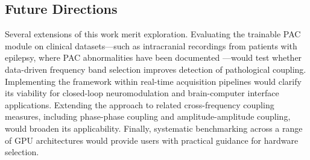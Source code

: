 \subsection{Future Directions}
Several extensions of this work merit exploration. Evaluating the trainable PAC module on clinical datasets---such as intracranial recordings from patients with epilepsy, where PAC abnormalities have been documented \cite{tort_measuring_2010}---would test whether data-driven frequency band selection improves detection of pathological coupling. Implementing the framework within real-time acquisition pipelines would clarify its viability for closed-loop neuromodulation and brain-computer interface applications. Extending the approach to related cross-frequency coupling measures, including phase-phase coupling and amplitude-amplitude coupling, would broaden its applicability. Finally, systematic benchmarking across a range of GPU architectures would provide users with practical guidance for hardware selection.

\label{sec:discussion}

